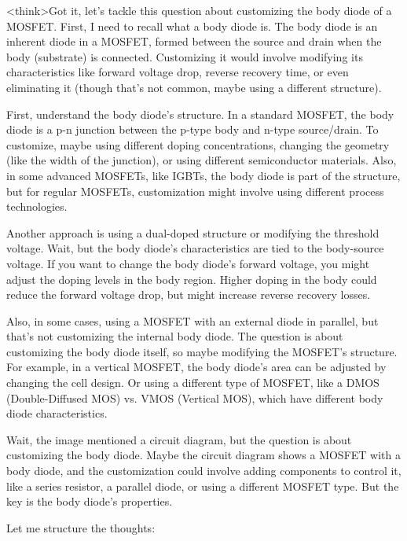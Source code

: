 <think>Got it, let's tackle this question about customizing the body diode of a MOSFET. First, I need to recall what a body diode is. The body diode is an inherent diode in a MOSFET, formed between the source and drain when the body (substrate) is connected. Customizing it would involve modifying its characteristics like forward voltage drop, reverse recovery time, or even eliminating it (though that's not common, maybe using a different structure).

First, understand the body diode's structure. In a standard MOSFET, the body diode is a p-n junction between the p-type body and n-type source/drain. To customize, maybe using different doping concentrations, changing the geometry (like the width of the junction), or using different semiconductor materials. Also, in some advanced MOSFETs, like IGBTs, the body diode is part of the structure, but for regular MOSFETs, customization might involve using different process technologies.

Another approach is using a dual-doped structure or modifying the threshold voltage. Wait, but the body diode's characteristics are tied to the body-source voltage. If you want to change the body diode's forward voltage, you might adjust the doping levels in the body region. Higher doping in the body could reduce the forward voltage drop, but might increase reverse recovery losses.

Also, in some cases, using a MOSFET with an external diode in parallel, but that's not customizing the internal body diode. The question is about customizing the body diode itself, so maybe modifying the MOSFET's structure. For example, in a vertical MOSFET, the body diode's area can be adjusted by changing the cell design. Or using a different type of MOSFET, like a DMOS (Double-Diffused MOS) vs. VMOS (Vertical MOS), which have different body diode characteristics.

Wait, the image mentioned a circuit diagram, but the question is about customizing the body diode. Maybe the circuit diagram shows a MOSFET with a body diode, and the customization could involve adding components to control it, like a series resistor, a parallel diode, or using a different MOSFET type. But the key is the body diode's properties.

Let me structure the thoughts:

